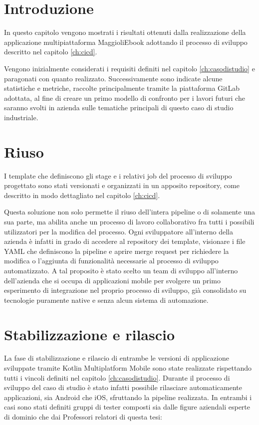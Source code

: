 
\section{Introduzione}
In questo capitolo vengono mostrati i risultati ottenuti dalla realizzazione della applicazione multipiattaforma MaggioliEbook adottando il processo di sviluppo descritto nel capitolo \ref{ch:cicd}.

Vengono inizialmente considerati i requisiti definiti nel capitolo \ref{ch:casodistudio} e paragonati con quanto realizzato. Successivamente sono indicate alcune statistiche e metriche, raccolte principalmente tramite la piattaforma GitLab adottata, al fine di creare un primo modello di confronto per i lavori futuri che saranno svolti in azienda sulle tematiche principali di questo caso di studio industriale.

\section{Riuso}
I template che definiscono gli stage e i relativi job del processo di sviluppo progettato sono stati versionati e organizzati in un apposito repository, come descritto in modo dettagliato nel capitolo \ref{ch:cicd}.

Questa soluzione non solo permette il riuso dell'intera pipeline o di solamente una sua parte, ma abilita anche un processo di lavoro collaborativo fra tutti i possibili utilizzatori per la modifica del processo. Ogni sviluppatore all'interno della azienda è infatti in grado di accedere al repository dei template, visionare i file YAML che definiscono la pipeline e aprire merge request per richiedere la modifica o l'aggiunta di funzionalità necessarie al processo di sviluppo automatizzato. A tal proposito è stato scelto un team di sviluppo all'interno dell'azienda che si occupa di applicazioni mobile per svolgere un primo esperimento di integrazione nel proprio processo di sviluppo, già consolidato su tecnologie puramente native e senza alcun sistema di automazione.

\section{Stabilizzazione e rilascio}
La fase di stabilizzazione e rilascio di entrambe le versioni di applicazione sviluppate tramite Kotlin Multiplatform Mobile sono state realizzate rispettando tutti i vincoli definiti nel capitolo \ref{ch:casodistudio}. Durante il processo di sviluppo del caso di studio è stato infatti possibile rilasciare automaticamente applicazioni, sia Android che iOS, sfruttando la pipeline realizzata. In entrambi i casi sono stati definiti gruppi di tester composti sia dalle figure aziendali esperte di dominio che dai Professori relatori di questa tesi:

